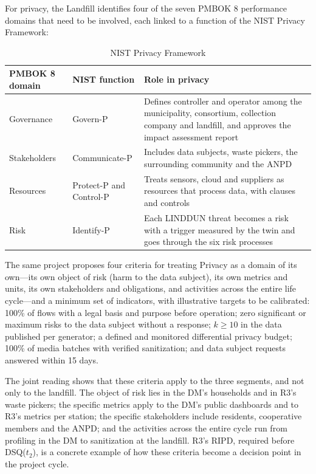 \documentclass[12pt,a4paper,article,oneside,brazil,english]{abntex2}
\newcommand{\fontetab}[1]{\par\vspace{3pt}{\small\noindent Source: #1\par}}
\newcommand{\dsq}[1]{DSQ($t_{#1}$)}
\begin{document}
For privacy, the Landfill identifies four of the seven PMBOK 8 performance domains that need to be involved, each linked to a function of the NIST Privacy Framework:

\begin{table}[!htbp]
\centering
\caption{NIST Privacy Framework}
\label{tab:nist}
\small
\begin{tabularx}{\linewidth}{>{\raggedright\arraybackslash}p{3.2cm} >{\raggedright\arraybackslash}p{3cm} Y}
\hline
\textbf{PMBOK 8 domain} & \textbf{NIST function} & \textbf{Role in privacy}\\
\hline
Governance & Govern-P & Defines controller and operator among the municipality, consortium, collection company and landfill, and approves the impact assessment report\\
Stakeholders & Communicate-P & Includes data subjects, waste pickers, the surrounding community and the ANPD\\
Resources & Protect-P and Control-P & Treats sensors, cloud and suppliers as resources that process data, with clauses and controls\\
Risk & Identify-P & Each LINDDUN threat becomes a risk with a trigger measured by the twin and goes through the six risk processes\\
\hline
\end{tabularx}
\fontetab{Prepared by the author (2026).}
\end{table}

The same project proposes four criteria for treating Privacy as a domain of its own---its own object of risk (harm to the data subject), its own metrics and units, its own stakeholders and obligations, and activities across the entire life cycle---and a minimum set of indicators, with illustrative targets to be calibrated: 100\% of flows with a legal basis and purpose before operation; zero significant or maximum risks to the data subject without a response; $k \geq 10$ in the data published per generator; a defined and monitored differential privacy budget; 100\% of media batches with verified sanitization; and data subject requests answered within 15 days.

The joint reading shows that these criteria apply to the three segments, and not only to the landfill. The object of risk lies in the DM's households and in R3's waste pickers; the specific metrics apply to the DM's public dashboards and to R3's metrics per station; the specific stakeholders include residents, cooperative members and the ANPD; and the activities across the entire cycle run from profiling in the DM to sanitization at the landfill. R3's RIPD, required before \dsq{2}, is a concrete example of how these criteria become a decision point in the project cycle.
\end{document}
